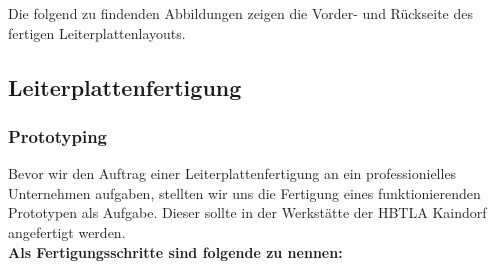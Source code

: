 Die folgend zu findenden Abbildungen zeigen die Vorder- und Rückseite des fertigen Leiterplattenlayouts.

\subsection{Leiterplattenfertigung}

\subsubsection{Prototyping}

Bevor wir den Auftrag einer Leiterplattenfertigung an ein professionielles Unternehmen aufgaben, stellten wir uns die Fertigung eines funktionierenden Prototypen als Aufgabe.
Dieser sollte in der Werkstätte der HBTLA Kaindorf angefertigt werden. \\

\textbf{Als Fertigungsschritte sind folgende zu nennen:}


